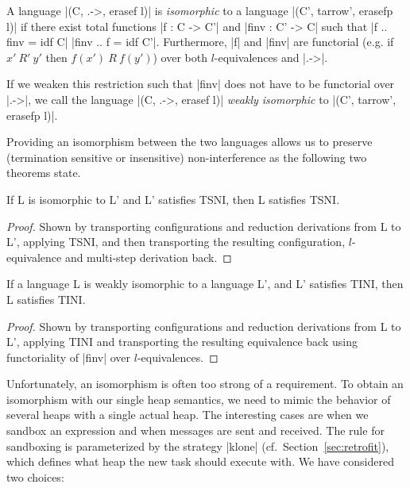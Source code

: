\begin{definition}
  A language |(C, .->, erasef l)| is \textit{isomorphic} to a
  language |(C', tarrow', erasefp l)| if there exist total functions |f
  : C -> C'| and |finv : C' -> C| such that |f .. finv = idf C| |finv
  .. f = idf C'|.  Furthermore, |f| and |finv| are functorial (e.g. if
  $x'\ R'\ y'$ then $f(x')\ R\ f(y')$) over both
  $l$-equivalences and |.->|.
  
  If we weaken this restriction such that |finv| does
  not have to be functorial over |.->|, we call the
  language |(C, .->, erasef l)| \textit{weakly isomorphic} to
  |(C', tarrow', erasefp l)|.
\end{definition}

Providing an isomorphism between the two languages allows us to
preserve (termination sensitive or insensitive) non-interference
as the following two theorems state.

\begin{theorem}
  \label{thm:iso-tsni}
  If L is isomorphic to L' and L' satisfies TSNI, then
  L satisfies TSNI.
\end{theorem}

\begin{proof}
  Shown by transporting configurations and reduction derivations from
  L to L', applying TSNI, and then transporting the
  resulting configuration, $l$-equivalence and multi-step derivation back.
\end{proof}

\begin{theorem}
  \label{thm:iso-tini}
  If a language L is weakly isomorphic to a language L', and L'
  satisfies TINI, then L satisfies TINI.
\end{theorem}

\begin{proof}
  Shown by transporting configurations and reduction derivations
  from L to L', applying TINI and transporting the resulting
  equivalence back using functoriality of |finv| over $l$-equivalences.
\end{proof}

Unfortunately, an isomorphism is often too strong of a requirement.
To obtain an isomorphism with our single heap semantics, we need to mimic the
behavior of several heaps with a single actual heap.
The interesting cases are when we sandbox
an expression and when messages are sent and received.
The rule for sandboxing is
parameterized by the strategy |klone| (cf.\ Section~\ref{sec:retrofit}),
which defines what heap the new task
should execute with.  We have considered two choices:

